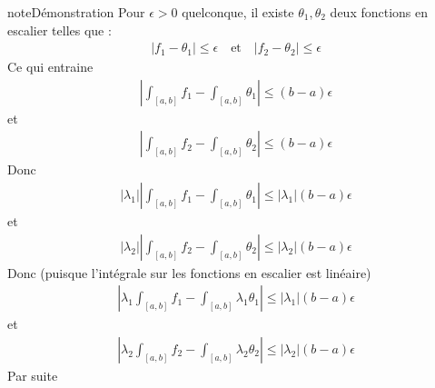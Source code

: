 \documentclass[letterpaper,10pt,french]{jupyterBook}
\begin{document}
\begin{sphinxadmonition}{note}{Démonstration}
\sphinxAtStartPar
Pour \(\epsilon>0\) quelconque, il existe \(\theta_1, \theta_2\) deux fonctions en escalier telles que :
\begin{equation*}
\begin{split}
|f_1 - \theta_1| \leq \epsilon ~~~ \mbox{ et } ~~~ |f_2 - \theta_2| \leq \epsilon
\end{split}
\end{equation*}
\sphinxAtStartPar
Ce qui entraine
\begin{equation*}
\begin{split}
\left|\int_{[a, b]} f_1- \int_{[a, b]} \theta_1 \right| \leq (b-a)\epsilon
\end{split}
\end{equation*}
\sphinxAtStartPar
et
\begin{equation*}
\begin{split}
\left|\int_{[a, b]} f_2- \int_{[a, b]} \theta_2 \right| \leq (b-a)\epsilon
\end{split}
\end{equation*}
\sphinxAtStartPar
Donc
\begin{equation*}
\begin{split}
|\lambda_1|\left|\int_{[a, b]} f_1- \int_{[a, b]} \theta_1 \right| \leq |\lambda_1|(b-a)\epsilon
\end{split}
\end{equation*}
\sphinxAtStartPar
et
\begin{equation*}
\begin{split}
|\lambda_2|\left|\int_{[a, b]} f_2- \int_{[a, b]} \theta_2 \right| \leq |\lambda_2|(b-a)\epsilon
\end{split}
\end{equation*}
\sphinxAtStartPar
Donc (puisque l’intégrale sur les fonctions en escalier est linéaire)
\begin{equation*}
\begin{split}
\left|\lambda_1\int_{[a, b]} f_1- \int_{[a, b]} \lambda_1\theta_1 \right| \leq |\lambda_1|(b-a)\epsilon
\end{split}
\end{equation*}
\sphinxAtStartPar
et
\begin{equation*}
\begin{split}
\left|\lambda_2\int_{[a, b]} f_2- \int_{[a, b]} \lambda_2\theta_2 \right| \leq |\lambda_2|(b-a)\epsilon
\end{split}
\end{equation*}
\sphinxAtStartPar
Par suite
\begin{equation*}
\begin{split}

\end{split}
\end{equation*}
\end{sphinxadmonition}
\end{document}
